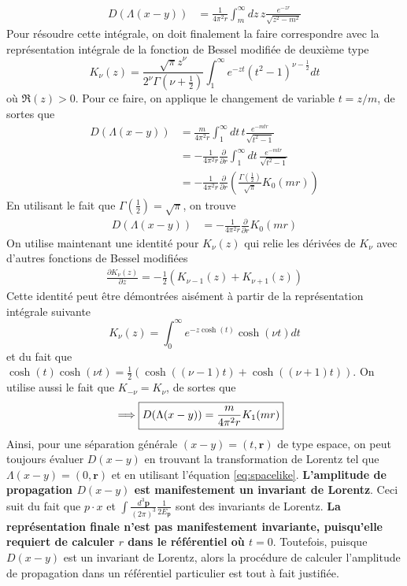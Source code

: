\documentclass{article}
\numberwithin{equation}{section}
\begin{document}
\begin{align}
        \nonumber
D(\Lambda(x - y)) 
        &= \frac{1}{4\pi^2r}
        \int_{m }^{\infty } dz\, z   \frac{ e^{-zr}}{\sqrt{z^2 - m^2}}
\end{align}
Pour résoudre cette intégrale, on doit finalement la faire correspondre avec la représentation intégrale de la fonction de Bessel modifiée de deuxième 
type
\begin{equation}\label{eq:bessel2}
        K_{\nu}(z) = \frac{\sqrt{\pi} z^{\nu}}{2^{\nu}\Gamma(\nu + \frac{1}{2})} \int_{1}^{\infty } e^{-zt} (t^{2} - 1)^{\nu - \frac{1}{2}}dt
\end{equation} 
où $\Re(z) > 0$. Pour ce faire, on applique le changement de variable $t = z / m$, de sortes que
\begin{align*}
D(\Lambda(x - y))  &= \frac{m}{4\pi^2r} \int_{1}^{\infty } dt\, t \frac{ e^{-mtr}}{\sqrt{t^2 - 1}} \\
         &= -\frac{1}{4\pi^2r} \frac{\partial}{\partial r}\int_{1}^{\infty } dt\,\frac{ e^{-mtr}}{\sqrt{t^2 - 1}} \\
        &= -\frac{1}{4\pi^2r} \frac{\partial}{\partial r} \left(  \frac{\Gamma(\frac{1}{2}) }{\sqrt{\pi}} K_{0}(mr) \right)
\end{align*}
En utilisant le fait que $\Gamma(\frac{1}{2}) = \sqrt{\pi}$, on trouve
\begin{align*}
        D(\Lambda(x - y)) &= -\frac{1}{4\pi^2r} \frac{\partial}{\partial r} K_{0}(mr)
\end{align*}
On utilise maintenant une identité pour $K_\nu(z)$ qui relie les dérivées de $K_{\nu}$ avec d'autres 
fonctions de Bessel modifiées
\begin{align}\label{eq:bessel id1}
       \frac{\partial K_\nu(z)}{\partial z} = -\frac{1}{2}(K_{\nu-1}(z) + K_{\nu+1}(z)) 
\end{align}
Cette identité peut être démontrées aisément à partir de la représentation intégrale suivante
\begin{equation}
        K_{\nu}(z) = \int_{0}^{\infty } e^{-z \cosh(t)} \cosh(\nu t) dt
\end{equation} 
et du fait que $\cosh(t)\cosh(\nu t) = \frac{1}{2}(\cosh((\nu - 1) t) + \cosh((\nu + 1)t))$. On utilise aussi le fait que 
$K_{-\nu} = K_{\nu}$, de sortes que
\begin{align}
        \label{eq:spacelike}
        \implies \Aboxed{D(\Lambda(x - y)) &= \frac{m}{4\pi^2r}  K_1(mr) }
\end{align}
Ainsi, pour une séparation générale $(x - y) = (t, \mathbf{r})$ de type espace, 
on peut toujours évaluer $D(x - y)$ en trouvant la transformation de Lorentz tel que $\Lambda(x - y) = (0, \mathbf{r})$ et 
en utilisant l'équation \eqref{eq:spacelike}. \textbf{L'amplitude de propagation $D(x - y)$ est manifestement un invariant de Lorentz}. Ceci suit du fait 
que $p \cdot x$ et $\int \frac{d^{3} \mathbf{p}}{(2\pi)^{3}} \frac{1}{2E_{\mathbf{p}}}$ sont des invariants de Lorentz. \textbf{La représentation finale 
n'est pas manifestement invariante, puisqu'elle requiert de calculer $r$ dans le référentiel où $t = 0$}. Toutefois, puisque $D(x - y)$ est un invariant de Lorentz, 
alors la procédure de calculer l'amplitude de propagation dans un référentiel particulier est tout à fait justifiée.
\end{document}
